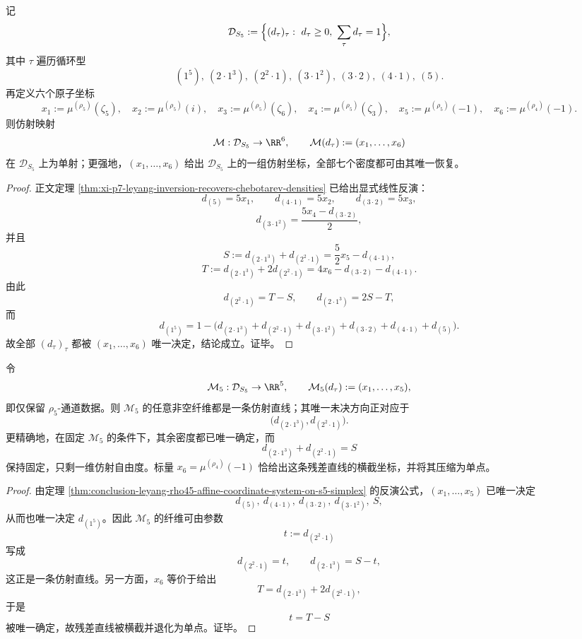 \begin{theorem}\label{thm:conclusion-leyang-rho45-affine-coordinate-system-on-s5-simplex}
记
\[
\mathcal D_{S_5}
:=
\Bigl\{
(d_\tau)_\tau:\ d_\tau\ge 0,\ \sum_\tau d_\tau=1
\Bigr\},
\]
其中 \(\tau\) 遍历循环型
\[
(1^5),\ (2\cdot1^3),\ (2^2\cdot1),\ (3\cdot1^2),\ (3\cdot2),\ (4\cdot1),\ (5).
\]
再定义六个原子坐标
\[
x_1:=\mu^{(\rho_5)}(\zeta_5),\quad
x_2:=\mu^{(\rho_5)}(i),\quad
x_3:=\mu^{(\rho_5)}(\zeta_6),\quad
x_4:=\mu^{(\rho_5)}(\zeta_3),\quad
x_5:=\mu^{(\rho_5)}(-1),\quad
x_6:=\mu^{(\rho_4)}(-1).
\]
则仿射映射
\[
\mathcal M:\mathcal D_{S_5}\to \RR^6,
\qquad
\mathcal M(d_\tau):=(x_1,\dots,x_6)
\]
在 \(\mathcal D_{S_5}\) 上为单射；更强地，\((x_1,\dots,x_6)\) 给出 \(\mathcal D_{S_5}\) 上的一组仿射坐标，全部七个密度都可由其唯一恢复。
\end{theorem}
\begin{proof}
正文定理 \ref{thm:xi-p7-leyang-inversion-recovers-chebotarev-densities} 已给出显式线性反演：
\[
d_{(5)}=5x_1,\qquad
d_{(4\cdot1)}=5x_2,\qquad
d_{(3\cdot2)}=5x_3,
\]
\[
d_{(3\cdot1^2)}=\frac{5x_4-d_{(3\cdot2)}}{2},
\]
并且
\[
S:=d_{(2\cdot1^3)}+d_{(2^2\cdot1)}=\frac52x_5-d_{(4\cdot1)},
\]
\[
T:=d_{(2\cdot1^3)}+2d_{(2^2\cdot1)}=4x_6-d_{(3\cdot2)}-d_{(4\cdot1)}.
\]
由此
\[
d_{(2^2\cdot1)}=T-S,\qquad d_{(2\cdot1^3)}=2S-T,
\]
而
\[
d_{(1^5)}
=
1-\bigl(
d_{(2\cdot1^3)}+d_{(2^2\cdot1)}+d_{(3\cdot1^2)}+d_{(3\cdot2)}+d_{(4\cdot1)}+d_{(5)}
\bigr).
\]
故全部 \((d_\tau)_\tau\) 都被 \((x_1,\dots,x_6)\) 唯一决定，结论成立。证毕。
\end{proof}

\begin{theorem}\label{thm:conclusion-leyang-rho5-wall-compression-codimension-one-residual}
令
\[
\mathcal M_5:\mathcal D_{S_5}\to\RR^5,
\qquad
\mathcal M_5(d_\tau):=(x_1,\dots,x_5),
\]
即仅保留 \(\rho_5\)-通道数据。则 \(\mathcal M_5\) 的任意非空纤维都是一条仿射直线；其唯一未决方向正对应于
\[
\bigl(d_{(2\cdot1^3)},d_{(2^2\cdot1)}\bigr).
\]
更精确地，在固定 \(\mathcal M_5\) 的条件下，其余密度都已唯一确定，而
\[
d_{(2\cdot1^3)}+d_{(2^2\cdot1)}=S
\]
保持固定，只剩一维仿射自由度。标量 \(x_6=\mu^{(\rho_4)}(-1)\) 恰给出这条残差直线的横截坐标，并将其压缩为单点。
\end{theorem}
\begin{proof}
由定理 \ref{thm:conclusion-leyang-rho45-affine-coordinate-system-on-s5-simplex} 的反演公式，\((x_1,\dots,x_5)\) 已唯一决定
\[
d_{(5)},\ d_{(4\cdot1)},\ d_{(3\cdot2)},\ d_{(3\cdot1^2)},\ S,
\]
从而也唯一决定 \(d_{(1^5)}\)。因此 \(\mathcal M_5\) 的纤维可由参数
\[
t:=d_{(2^2\cdot1)}
\]
写成
\[
d_{(2^2\cdot1)}=t,\qquad d_{(2\cdot1^3)}=S-t,
\]
这正是一条仿射直线。另一方面，\(x_6\) 等价于给出
\[
T=d_{(2\cdot1^3)}+2d_{(2^2\cdot1)},
\]
于是
\[
t=T-S
\]
被唯一确定，故残差直线被横截并退化为单点。证毕。
\end{proof}

